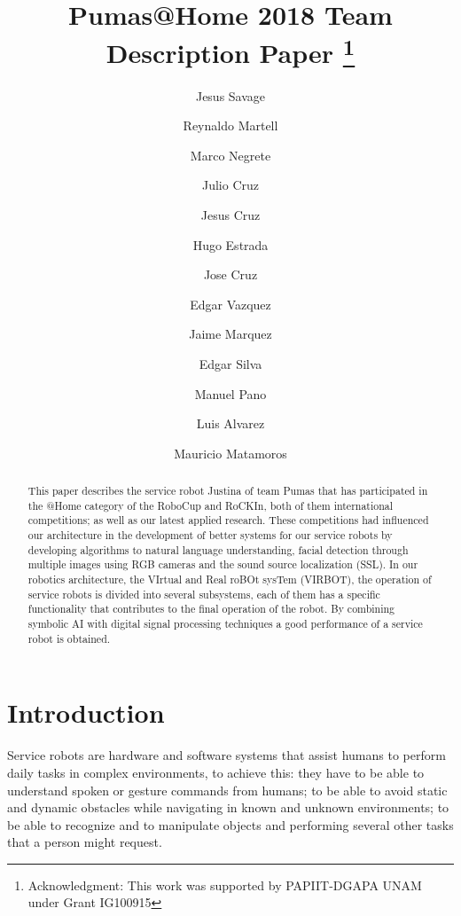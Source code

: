 \documentclass{llncs}
\begin{document}
\title{Pumas@Home 2018 Team Description Paper
\thanks{Acknowledgment: This work was supported by PAPIIT-DGAPA UNAM under Grant IG100915}}
\author{
	Jesus Savage 
	\and Reynaldo Martell 
	\and Marco Negrete 
	\and Julio Cruz 
	\and Jesus Cruz
	\and Hugo Estrada 
	\and Jose Cruz
	\and Edgar Vazquez
	\and Jaime Marquez
	\and Edgar Silva
	\and Manuel Pano 
	\and Luis Alvarez
	\and Mauricio Matamoros
}
\maketitle


\begin{abstract}

This paper describes the service robot Justina of team Pumas that has participated in the @Home category of the RoboCup and RoCKIn, both of them international competitions; as well as our latest applied research. These competitions had influenced our architecture in the development of better systems for our service robots by developing algorithms to natural language understanding, facial detection through multiple images using RGB cameras and the sound source localization (SSL). 
In our robotics architecture, the VIrtual and Real roBOt sysTem (VIRBOT), the operation of service robots is divided into several subsystems, each of them has a specific functionality  that contributes to the final operation of the robot.
By combining symbolic AI with digital signal processing techniques a good performance of a service robot is obtained.

\end{abstract}


\section{Introduction}

Service robots are hardware and software systems that assist humans to perform daily tasks in complex environments, to achieve this: they have to be able to understand spoken or gesture commands from humans; to be able to avoid static and dynamic obstacles while navigating in known and unknown environments; to be able to recognize and to manipulate objects and performing several other tasks that a person might request. 
\end{document}
